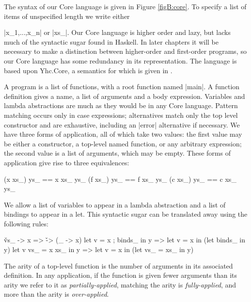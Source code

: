 

The syntax of our Core language is given in Figure \ref{figB:core}. To specify a list of items of unspecified length we write either \ignore|x_1,...,x_n| or |xs_|. Our Core language is higher order and lazy, but lacks much of the syntactic sugar found in Haskell. In later chapters it will be necessary to make a distinction between higher-order and first-order programs, so our Core language has some redundancy in its representation. The language is based upon Yhc.Core, a semantics for which is given in \cite{me:yhc_core}.

A program is a list of functions, with a root function named |main|. A function definition gives a name, a list of arguments and a body expression. Variables and lambda abstractions are much as they would be in any Core language.  Pattern matching occurs only in case expressions; alternatives match only the top level constructor and are exhaustive, including an |error| alternative if necessary. We have three forms of application, all of which take two values: the first value may be either a constructor, a top-level named function, or any arbitrary expression; the second value is a list of arguments, which may be empty. These forms of application give rise to three equivalences:

\ignore\begin{code}
(x xs_) ys_ == x xs_ ys_
(f xs_) ys_ == f xs_ ys_
(c xs_) ys_ == c xs_ ys_
\end{code}

We allow a list of variables to appear in a lambda abstraction and a list of bindings to appear in a let. This syntactic sugar can be translated away using the following rules:

\ignore\begin{code}
\v vs_ -> x              => \v -> (\vs_ -> x)
let v = x ; binds_ in y  => let v = x in (let binds_ in y)
let v vs_ = x xs_ in y   => let v = x in (let vs_ = xs_ in y)
\end{code}

The arity of a top-level function is the number of arguments in its associated definition. In any application, if the function is given fewer arguments than its arity we refer to it as \textit{partially-applied}, matching the arity is \textit{fully-applied}, and more than the arity is \textit{over-applied}.

